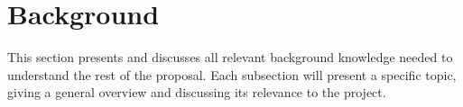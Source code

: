 \section{Background}
\label{sec:background}

This section presents and discusses all relevant background knowledge needed to understand the rest of the proposal.
Each subsection will present a specific topic, giving a general overview and discussing its relevance to the project.





